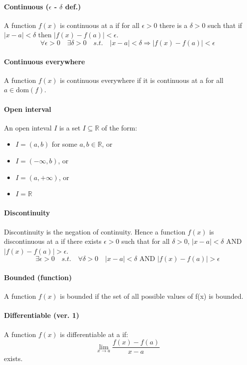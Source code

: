 \documentclass{article}
\newcommand{\R}{\mathbb{R}}
\begin{document}
\paragraph{Continuous ($ \epsilon $ - $ \delta $ def.)}
A function $ f(x) $ is continuous at a if for all $ \epsilon > 0 $ there is a $ \delta > 0 $ such that if $ |x - a| < \delta $ then $ |f(x) - f(a)| < \epsilon $.
\begin{equation}
\forall \epsilon > 0 \quad \exists \delta > 0 \quad s.t. \quad |x - a| < \delta \Rightarrow |f(x) - f(a)| < \epsilon
\end{equation}
\paragraph{Continuous everywhere}
A function $ f(x) $ is continuous everywhere if it is continuous at a for all $ a \in \textrm{dom}(f) $.
\paragraph{Open interval}
An open inteval $ I $ is a set $ I \subseteq \R $ of the form:
\begin{itemize}
\item $ I = (a, b) $ for some $ a, b \in \R $, or
\item $ I = (-\infty, b) $, or
\item $ I = (a, +\infty) $, or
\item $ I = \R $
\end{itemize}
\paragraph{Discontinuity}
Discontinuity is the negation of continuity. Hence a function $ f(x) $ is discontinuous at a if there exists $ \epsilon > 0 $ such that for all $ \delta > 0 $, $ |x - a| < \delta $ AND $ |f(x) - f(a)| > \epsilon $.
\begin{equation}
\exists \epsilon > 0 \quad s.t. \quad \forall \delta > 0 \quad |x - a| < \delta \textrm{ AND } |f(x) - f(a)| > \epsilon
\end{equation}
\paragraph{Bounded (function)}
A function $ f(x) $ is bounded if the set of all possible values of f(x) is bounded.
\paragraph{Differentiable (ver. 1)}
A function $ f(x) $ is differentiable at a if:
\begin{equation}
\lim_{x \to a}\frac{f(x) - f(a)}{x - a}
\end{equation}
exists.
\end{document}
